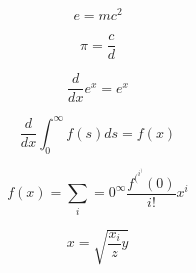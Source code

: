 \documentclass[a4paper, 12pt]{article}
\begin{document}
\begin{equation}
e = mc^2 
\end{equation}

\begin{equation}
\pi = \frac{c}{d}
\end{equation}

\begin{equation}
\frac{d}{dx} e^x = e^x
\end{equation}

\begin{equation}
\frac{d}{dx} \int_0^\infty f(s)ds = f(x)
\end{equation}

\begin{equation}
f(x) = \sum_{i} = 0^\infty \frac{f^(^i^)(0)}{i!} x^i
\end{equation}

\begin{equation}
x = \sqrt{\frac{x_i}{z} y}
\end{equation}
\end{document}
